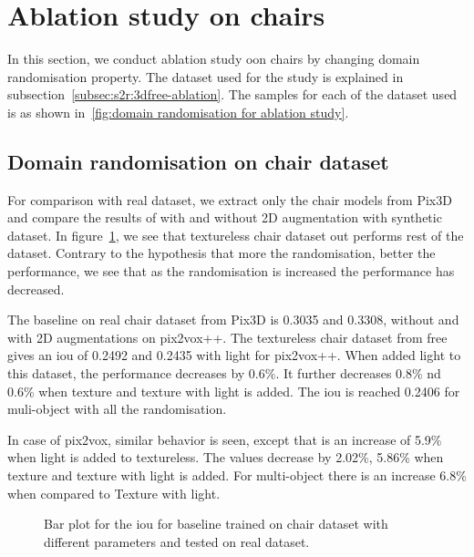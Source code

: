 \section{Ablation study on chairs}\label{sec:ablation-study-on-chairs}
In this section, we conduct ablation study oon chairs by changing domain randomisation property.
The dataset used for the study is explained in subsection~\ref{subsec:s2r:3dfree-ablation}.
The samples for  each of the dataset used is as shown in~\ref{fig:domain randomisation for ablation study}.

\subsection{Domain randomisation on chair dataset}\label{subsec:domain-randomisation-on-chair-dataset}
For comparison with real dataset, we extract only the chair models from Pix3D and compare the results of with and without 2D augmentation with synthetic dataset.
In figure~\ref{fig:ablation1}, we see that textureless chair dataset out performs rest of the dataset.
Contrary to the hypothesis that more the randomisation, better the performance, we see that as the randomisation is increased the performance has decreased.

The baseline on real chair dataset from Pix3D is 0.3035 and 0.3308, without and with 2D augmentations on pix2vox++.
The textureless chair dataset from \gls{free} gives an \gls{iou}  of 0.2492 and 0.2435 with light for pix2vox++.
When added light to this dataset, the performance decreases by 0.6\%.
It further decreases 0.8\% nd 0.6\% when texture and texture with light is added.
The \gls{iou}  is reached 0.2406 for muli-object with all the randomisation.

In case of pix2vox, similar behavior is seen, except that is an increase of 5.9\% when light is added to textureless.
The values decrease by 2.02\%, 5.86\% when texture and texture with light is added.
For multi-object there is an increase 6.8\% when compared to Texture with light.

\begin{figure}
    \centering
    \resizebox{\textwidth}{!}{}
    \caption{Bar plot for the \gls{iou}  for baseline trained on chair dataset with different parameters and tested on real dataset.}
    \label{fig:ablation1}
\end{figure}

